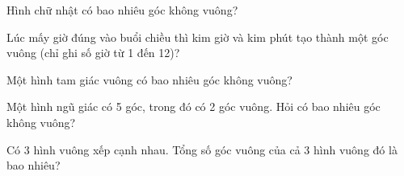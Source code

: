 \begin{ex} %
Hình chữ nhật có bao nhiêu góc không vuông?
\end{ex}

\begin{ex} %
Lúc mấy giờ đúng vào buổi chiều thì kim giờ và kim phút tạo thành một góc vuông (chỉ ghi số giờ từ 1 đến 12)?
\end{ex}

\begin{ex} %
Một hình tam giác vuông có bao nhiêu góc không vuông?
\end{ex}

\begin{ex} %
Một hình ngũ giác có 5 góc, trong đó có 2 góc vuông. Hỏi có bao nhiêu góc không vuông?
\end{ex}

\begin{ex} %
Có 3 hình vuông xếp cạnh nhau. Tổng số góc vuông của cả 3 hình vuông đó là bao nhiêu?
\end{ex}
